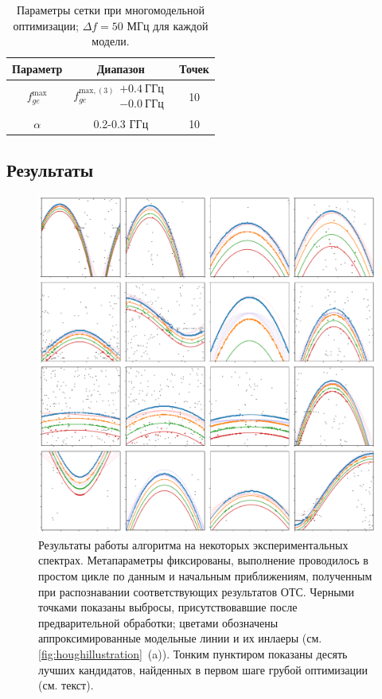 \documentclass[14pt, a4paper]{extreport}
\numberwithin{equation}{section}
\begin{document}
	\begin{table}
		\centering
		\small
		\begin{tabular}{ccc} \toprule
			Параметр & Диапазон & Точек \\
			\midrule
			$f_{ge}^\text{max}$ & $f_{ge}^{\text{max}, (3)}  \substack{+0.4\ \text{ГГц} \\ -0.0\ \text{ГГц}}$  & 10 \\
			$\alpha$ & 0.2-0.3 ГГц & 10 \\
			\bottomrule
		\end{tabular} 
		\caption{Параметры сетки при многомодельной оптимизации; $\Delta f = 50$ МГц для каждой модели.}
		\label{tab:tts_grid_multi}
	\end{table}

\subsection{Результаты}


\begin{figure}
	\includegraphics[width=1\linewidth]{Pictures/two_tone_fits}
	\caption{Результаты работы алгоритма на некоторых экспериментальных спектрах. Метапараметры фиксированы, выполнение проводилось в простом цикле по данным и начальным приближениям, полученным при распознавании соответствующих результатов ОТС. Черными точками показаны выбросы, присутствовавшие после предварительной обработки; цветами обозначены аппроксимированные модельные линии и их инлаеры (см. \autoref{fig:houghillustration}~(a)). Тонким пунктиром показаны десять лучших кандидатов, найденных в первом шаге грубой оптимизации (см. текст).}
	\label{fig:twotonefits}
\end{figure}
\end{document}
